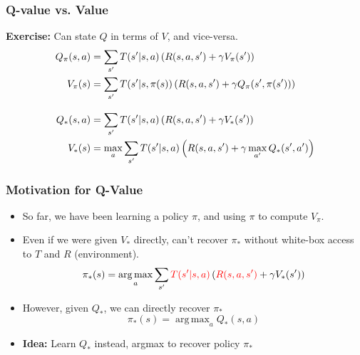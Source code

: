 \documentclass[10pt,a4paper]{beamer}
\DeclareMathOperator*{\argmax}{arg\,max}
\newcommand{\red}[1]{\textcolor{red}{#1}}
\begin{document}
\begin{frame}
	\frametitle{Q-value vs. Value}
	
\textbf{Exercise:} Can state $Q$ in terms of $V$, and vice-versa.
\begin{align*}
Q_\pi(s,a) &= \sum_{s'} T(s' | s,a) \left( R(s,a,s') + \gamma V_\pi(s') \right) \\
V_\pi(s) &= \sum_{s'} T(s' | s, \pi(s)) \left( R(s,a,s') 
	+ \gamma Q_\pi(s', \pi(s')) \right) \\
	\intertext{\quad}
	Q_*(s,a) &= \sum_{s'} T(s' | s,a) \left( R(s,a,s') + \gamma V_*(s') \right) \\
	V_*(s) &= \max_a \sum_{s'} T(s' | s, a) \left( R(s,a,s') 
	+ \gamma \max_{a'} Q_*(s', a') \right) \\
\end{align*}

\end{frame}


\begin{frame}
	\frametitle{Motivation for Q-Value}
\begin{itemize}
\item So far, we have been learning a policy $\pi$, and using
$\pi$ to compute $V_\pi$.
\pause
\item Even if we were given $V_*$ directly,
can't recover $\pi_*$ without white-box access to $T$ and $R$ (environment).
$$
\pi_*(s) = \argmax_a \sum_{s'} \red{T(s'| s, a)} \left( 
\red{R(s,a,s')} + 
\gamma V_*(s') \right)
$$  \pause
		\item However, given $Q_*$, we can directly recover $\pi_*$
		$$
		\pi_*(s) = \argmax_a Q_*(s,a)
		$$
		\pause
		\item \textbf{Idea:} Learn $Q_*$ instead, argmax to recover policy $\pi_*$
\end{itemize}
\end{frame}
\end{document}
